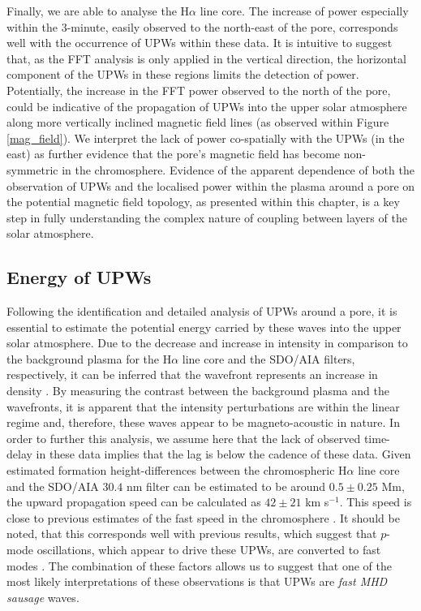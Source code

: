 	Finally, we are able to analyse the H$\alpha$ line core.
	The increase of power especially within the 3-minute, easily observed to the north-east of the pore, corresponds well with the occurrence of UPWs within these data.
	It is intuitive to suggest that, as the FFT analysis is only applied in the vertical direction, the horizontal component of the UPWs in these regions limits the detection of power.
	Potentially, the increase in the FFT power observed to the north of the pore, could be indicative of the propagation of UPWs into the upper solar atmosphere along more vertically inclined magnetic field lines (as observed within Figure \ref{mag_field}).
	We interpret the lack of power co-spatially with the UPWs (in the east) as further evidence that the pore's magnetic field has become non-symmetric in the chromosphere.
	Evidence of the apparent dependence of both the observation of UPWs and the localised power within the plasma around a pore on the potential magnetic field topology, as presented within this chapter, is a key step in fully understanding the complex nature of coupling between layers of the solar atmosphere.

\subsection{Energy of UPWs}

	Following the identification and detailed analysis of UPWs around a pore, it is essential to estimate the potential energy carried by these waves into the upper solar atmosphere.
	Due to the decrease and increase in intensity in comparison to the background plasma for the H$\alpha$ line core and the SDO/AIA filters, respectively, it can be inferred that the wavefront represents an increase in density \citep{Allen1947,Leenaarts2012}.
	By measuring the contrast between the background plasma and the wavefronts, it is apparent that the intensity perturbations are within the linear regime and, therefore, these waves appear to be magneto-acoustic in nature.
	In order to further this analysis, we assume here that the lack of observed time-delay in these data implies that the lag is below the cadence of these data.
	Given estimated formation height-differences between the chromospheric H$\alpha$ line core and the SDO/AIA $30.4$ nm filter can be estimated to be around $0.5\pm0.25$ Mm, the upward propagation speed can be calculated as $42\pm21$ km s$^{-1}$.
	This speed is close to previous estimates of the fast speed in the chromosphere \citep{Morton2012}.
	It should be noted, that this corresponds well with previous results, which suggest that $p$-mode oscillations, which appear to drive these UPWs, are converted to fast modes \citep{Vigeesh2012}.
	The combination of these factors allows us to suggest that one of the most likely interpretations of these observations is that UPWs are {\it fast MHD sausage} waves.

